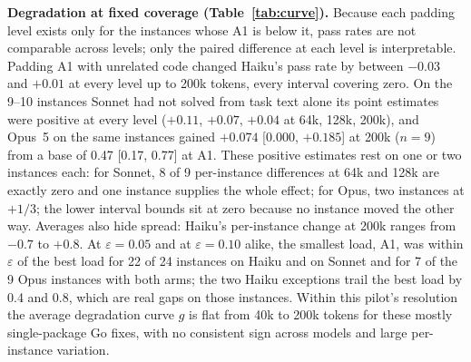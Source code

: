 \documentclass[10pt]{article}
\newcommand{\eps}{\varepsilon}
\begin{document}
\textbf{Degradation at fixed coverage (Table~\ref{tab:curve}).} Because each padding level exists only for the instances whose A1 is below it, pass rates are not comparable across levels; only the paired difference at each level is interpretable. Padding A1 with unrelated code changed Haiku's pass rate by between $-0.03$ and $+0.01$ at every level up to 200k tokens, every interval covering zero. On the 9--10 instances Sonnet had not solved from task text alone its point estimates were positive at every level ($+0.11$, $+0.07$, $+0.04$ at 64k, 128k, 200k), and Opus~5 on the same instances gained $+0.074$ [$0.000$, $+0.185$] at 200k ($n=9$) from a base of 0.47 [0.17, 0.77] at A1. These positive estimates rest on one or two instances each: for Sonnet, 8 of 9 per-instance differences at 64k and 128k are exactly zero and one instance supplies the whole effect; for Opus, two instances at $+1/3$; the lower interval bounds sit at zero because no instance moved the other way. Averages also hide spread: Haiku's per-instance change at 200k ranges from $-0.7$ to $+0.8$. At $\eps = 0.05$ and at $\eps = 0.10$ alike, the smallest load, A1, was within $\eps$ of the best load for 22 of 24 instances on Haiku and on Sonnet and for 7 of the 9 Opus instances with both arms; the two Haiku exceptions trail the best load by 0.4 and 0.8, which are real gaps on those instances. Within this pilot's resolution the average degradation curve $g$ is flat from 40k to 200k tokens for these mostly single-package Go fixes, with no consistent sign across models and large per-instance variation.
\end{document}
